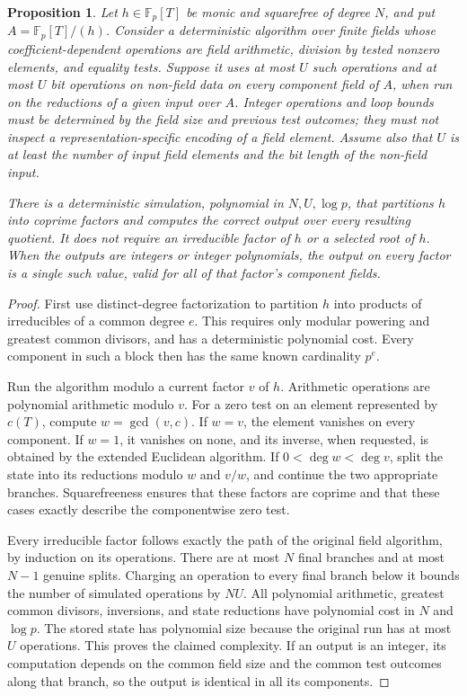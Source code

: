 \documentclass[11pt]{article}
\newtheorem{proposition}[theorem]{Proposition}
\theoremstyle{definition}
\theoremstyle{remark}
\begin{document}
\begin{proposition}\label{prop:etale-arithmetic-simulation}
Let \(h\in\mathbb F_p[T]\) be monic and squarefree of degree \(N\),
and put \(A=\mathbb F_p[T]/(h)\).
Consider a deterministic algorithm over finite fields whose
coefficient-dependent operations are field arithmetic, division by
tested nonzero elements, and equality tests. Suppose it uses at most
\(U\) such operations and at most \(U\) bit operations on
non-field data on every component field of \(A\), when run on
the reductions of a given input over \(A\). Integer operations and
loop bounds must be determined by the field size and previous
test outcomes; they must not inspect a representation-specific
encoding of a field element.
Assume also that \(U\) is at least the number of input field
elements and the bit length of the non-field input.

There is a deterministic simulation, polynomial in
\(N,U,\log p\), that partitions \(h\) into coprime factors and
computes the correct output over every resulting quotient. It
does not require an irreducible factor of \(h\) or a selected root
of \(h\). When the outputs are integers or integer polynomials,
the output on every factor is a single such value, valid for all
of that factor's component fields.
\end{proposition}
\begin{proof}
First use distinct-degree factorization to partition \(h\) into
products of irreducibles of a common degree \(e\). This requires
only modular powering and greatest common divisors, and has a
deterministic polynomial cost. Every component in such a block
then has the same known cardinality \(p^e\).

Run the algorithm modulo a current factor \(v\) of \(h\).
Arithmetic operations are polynomial arithmetic modulo \(v\).
For a zero test on an element represented by \(c(T)\), compute
\(w=\gcd(v,c)\). If \(w=v\), the element vanishes on every
component. If \(w=1\), it vanishes on none, and its inverse,
when requested, is obtained by the extended Euclidean algorithm.
If \(0<\deg w<\deg v\), split the state into its reductions
modulo \(w\) and \(v/w\), and continue the two appropriate
branches. Squarefreeness ensures that these factors are coprime
and that these cases exactly describe the componentwise zero test.

Every irreducible factor follows exactly the path of the original
field algorithm, by induction on its operations. There are at
most \(N\) final branches and at most \(N-1\) genuine splits.
Charging an operation to every final branch below it bounds the
number of simulated operations by \(NU\). All polynomial
arithmetic, greatest common divisors, inversions, and state
reductions have polynomial cost in \(N\) and \(\log p\).
The stored state has polynomial size because the original run
has at most \(U\) operations. This proves the claimed complexity.
If an output is an integer, its computation depends on the
common field size and the common test outcomes along that
branch, so the output is identical in all its components.
\end{proof}
\end{document}
